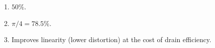\begin{enumerate}[leftmargin=1.6em,itemsep=2pt]
\item $50\%$.
\item $\pi/4 = 78.5\%$.
\item Improves linearity (lower distortion) at the cost of drain efficiency.
\end{enumerate}
